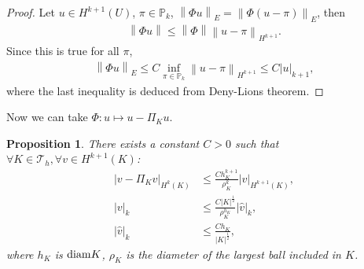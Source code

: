 \documentclass[11pt,a4paper,center,notitlepage]{article}
\numberwithin{equation}{section}
\newtheorem{prop}{Proposition}[section]
\begin{document}
\begin{proof}
Let $u\in H^{k+1}\left(U\right)$, $\pi \in \mathbb{P}_k$, ${\left\| {\Phi u} \right\|_E} = {\left\| {\Phi \left( {u - \pi } \right)} \right\|_E}$, then 
\begin{align}
\left\| {\Phi u} \right\| \le \left\| \Phi  \right\|{\left\| {u - \pi } \right\|_{{H^{k + 1}}}} .
\end{align}
Since this is true for all $\pi$,
\begin{align}
{\left\| {\Phi u} \right\|_E} \le C\mathop {\inf }\limits_{\pi  \in {\mathbb{P}_k}} {\left\| {u - \pi } \right\|_{{H^{k + 1}}}} \le C{\left| u \right|_{k + 1}} ,
\end{align}
where the last inequality is deduced from Deny-Lions theorem.
\end{proof}
Now we can take $\Phi :u \mapsto u - {\Pi _K}u$.

\begin{prop}
There exists a constant $C>0$ such that  $\forall K \in {\mathcal{T}_h},\forall v \in {H^{k + 1}}\left( K \right)$:
\begin{align}
{\left| {v - {\Pi _K}v} \right|_{{H^k}\left( K \right)}} &\le \frac{{Ch_K^{k + 1}}}{{\rho _K^k}}{\left| v \right|_{{H^{k + 1}}\left( K \right)}},\\
{\left| v \right|_k} &\le \frac{{C{{\left| K \right|}^{\frac{1}{2}}}}}{{\rho _K^{{h_K}}}}{\left| {\widehat v} \right|_k},\\
{\left| {\widehat v} \right|_k} &\le \frac{{C{h_K}}}{{{{\left| K \right|}^{\frac{1}{2}}}}},
\end{align}
where $h_K$ is ${\rm diam } K$, $\rho _K$ is the diameter of the largest ball included in $K$.
\end{prop}
\end{document}
